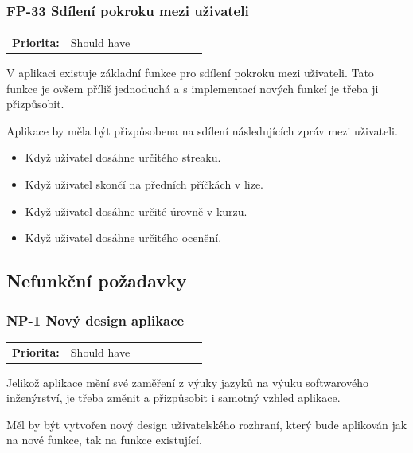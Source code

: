 \subsubsection{FP-33 Sdílení pokroku mezi uživateli}

\begin{tabular}{lp{0.7\linewidth}}
    \textbf{Priorita:} & Should have \\
\end{tabular}

V aplikaci existuje základní funkce pro sdílení pokroku mezi uživateli. Tato funkce je ovšem příliš jednoduchá a s implementací nových funkcí je třeba ji přizpůsobit.

Aplikace by měla být přizpůsobena na sdílení následujících zpráv mezi uživateli.


\begin{itemize}
    \item Když uživatel dosáhne určitého streaku.
    \item Když uživatel skončí na předních příčkách v lize.
    \item Když uživatel dosáhne určité úrovně v kurzu.
    \item Když uživatel dosáhne určitého ocenění.
\end{itemize}

\subsection{Nefunkční požadavky}

\subsubsection{NP-1 Nový design aplikace}

\begin{tabular}{lp{0.7\linewidth}}
    \textbf{Priorita:} & Should have \\
\end{tabular}

Jelikož aplikace mění své zaměření z výuky jazyků na výuku softwarového inženýrství, je třeba změnit a přizpůsobit i samotný vzhled aplikace.

Měl by být vytvořen nový design uživatelského rozhraní, který bude aplikován jak na nové funkce, tak na funkce existující.

